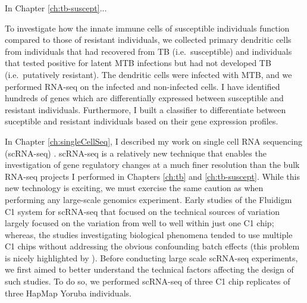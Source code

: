 In Chapter \ref{ch:tb-suscept}...

To investigate how the innate immune cells of susceptible individuals
function compared to those of resistant individuals, we collected
primary dendritic cells from individuals that had recovered from TB
(i.e.~susceptible) and individuals that tested positive for latent MTB
infections but had not developed TB (i.e.~putatively resistant). The
dendritic cells were infected with MTB, and we performed RNA-seq on
the infected and non-infected cells. I have identified hundreds of
genes which are differentially expressed between susceptible and
resistant individuals. Furthermore, I built a classifier to
differentiate between suceptible and resistant individuals based on
their gene expression profiles.

In Chapter \ref{ch:singleCellSeq}, I described my work on single cell
RNA sequencing (scRNA-seq) \citep{Tung2016}. scRNA-seq is a relatively
new technique that enables the investigation of gene regulatory
changes at a much finer resolution than the bulk RNA-seq projects I
performed in Chapters \ref{ch:tb} and \ref{ch:tb-suscept}. While this
new technology is exciting, we must exercise the same caution as when
performing any large-scale genomics experiment. Early studies of the
Fluidigm C1 system for scRNA-seq that focused on the technical sources
of variation largely focused on the variation from well to well within
just one C1 chip; whereas, the studies investigating biological
phenomena tended to use multiple C1 chips without addressing the
obvious confounding batch effects (this problem is nicely highlighted
by \citep{Hicks2015}). Before conducting large scale scRNA-seq
experiments, we first aimed to better understand the technical factors
affecting the design of such studies. To do so, we performed scRNA-seq
of three C1 chip replicates of three HapMap Yoruba individuals.


